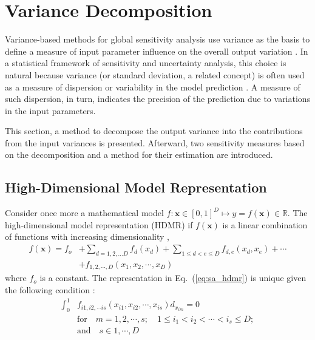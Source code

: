 \section{Variance Decomposition}\label{sec:sa_variance_decomposition}

Variance-based methods for global sensitivity analysis use variance as the basis to define a measure of input parameter influence on the overall output variation \cite{Cacuci2004}.
In a statistical framework of sensitivity and uncertainty analysis, 
this choice is natural because variance (or standard deviation, a related concept) is often used as a measure of dispersion or variability in the model prediction \cite{Saltelli2008}.
A measure of such dispersion, in turn, indicates the precision of the prediction due to variations in the input parameters.

This section, a method to decompose the output variance into the contributions from the input variances is presented.
Afterward, two sensitivity measures based on the decomposition and a method for their estimation are introduced.

\subsection{High-Dimensional Model Representation}\label{sub:sa_hdmr}

Consider once more a mathematical model $f: \mathbf{x} \in [0,1]^D \mapsto y = f(\mathbf{x}) \in \mathbb{R}$.
The high-dimensional model representation (HDMR) if $f(\mathbf{x})$ is a linear combination of functions with increasing dimensionality \cite{Li2001},
\begin{equation}
	\begin{split}
		f(\mathbf{x}) = f_o & + \sum_{d=1,2,...D} f_d(x_d) + \sum_{1\leq d < e \leq D} f_{d,e} (x_d, x_e) + \cdots  \\
	                      & + f_{1,2,\cdots,D} (x_1, x_2, \cdots, x_D)
	\end{split}
\label{eq:sa_hdmr}
\end{equation}
where $f_o$ is a constant. 
The representation in Eq.~(\ref{eq:sa_hdmr}) is unique given the following condition \cite{Sobol2001}:
\begin{equation}
  \begin{split}
    \int_{0}^{1} & f_{i1, i2, \cdots is}(x_{i1}, x_{i2}, \cdots, x_{is}) d_{x_{im}} = 0  \\
                 & \text{for}\quad m = 1,2,\cdots,s;\quad 1\leq i_1 < i_2 < \cdots < i_s \leq D; \\
                 & \text{and} \quad s \in {1,\cdots,D}
   \end{split}
\label{eq:sa_unicity}
\end{equation}

